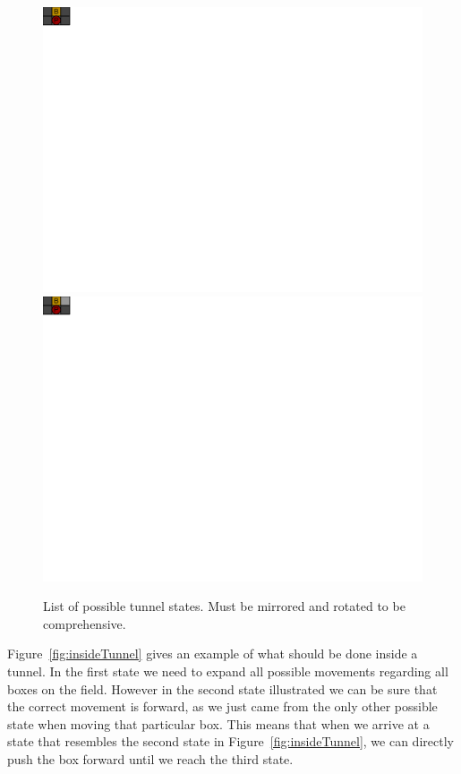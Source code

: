\documentclass[a4paper,11pt]{article}
\renewcommand{\*}[0]{\cdot}
\begin{document}
\begin{figure}[h!]
    \begin{center}
        \includegraphics{figures/tunnelPossibilities1}
        \includegraphics{figures/tunnelPossibilities2}
    \end{center}
    \caption{List of possible tunnel states. Must be mirrored and rotated to be
    comprehensive.}
    \label{fig:tunnelPossibilities}
\end{figure}


Figure~\ref{fig:insideTunnel} gives an example of what should be done inside a
tunnel. In the first state we need to expand all possible movements regarding
all boxes on the field. However in the second state illustrated we can be sure
that the correct movement is forward, as we just came from the only other
possible state when moving that particular box. This means that when we arrive
at a state that resembles the second state in Figure~\ref{fig:insideTunnel}, we
can directly push the box forward until we reach the third state.
\end{document}

